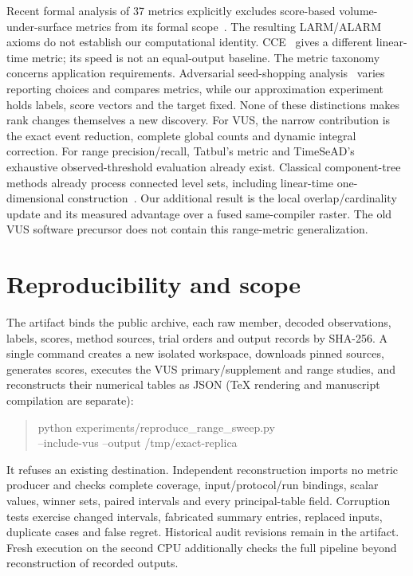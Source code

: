 Recent formal analysis of 37 metrics explicitly excludes score-based
volume-under-surface metrics from its formal scope~\cite{wagner2025formallyexploringtimeseriesanomaly}.
The resulting LARM/ALARM axioms do not establish our computational identity.
CCE~\cite{zhong2025cceconfidenceconsistencyevaluationtime} gives a different
linear-time metric; its speed is not an equal-output baseline. The metric
taxonomy~\cite{yang2026problemorientedtaxonomyevaluationmetrics} concerns
application requirements. Adversarial seed-shopping
analysis~\cite{lyu2026didactuallyfixit} varies reporting choices and compares
metrics, while our approximation experiment holds labels, score vectors and
the target fixed. None of these distinctions makes rank changes themselves a
new discovery. For VUS, the narrow contribution is the exact event reduction, complete global
counts and dynamic integral correction. For range precision/recall, Tatbul's
metric and TimeSeAD's exhaustive observed-threshold evaluation already exist.
Classical component-tree methods already process connected level sets, including
linear-time one-dimensional construction~\cite{menotti2007}.
Our additional result is the local overlap/cardinality update and its measured
advantage over a fused same-compiler raster. The old VUS software precursor does
not contain this range-metric generalization.

\section{Reproducibility and scope}
The artifact binds the public archive, each raw member, decoded observations,
labels, scores, method sources, trial orders and output records by SHA-256.
A single command creates a new isolated workspace, downloads pinned sources,
generates scores, executes the VUS primary/supplement and range studies, and reconstructs their numerical tables
as JSON (TeX rendering and manuscript compilation are separate):
\begin{quote}\small\ttfamily
python experiments/reproduce\_range\_sweep.py\\
\hspace*{1em}--include-vus --output /tmp/exact-replica
\end{quote}
It refuses an existing destination. Independent reconstruction imports no
metric producer and checks complete coverage, input/protocol/run bindings,
scalar values, winner sets, paired intervals and every principal-table field.
Corruption tests exercise changed intervals, fabricated summary entries,
replaced inputs, duplicate cases and false regret. Historical audit revisions
remain in the artifact. Fresh execution on the second CPU additionally checks
the full pipeline beyond reconstruction of recorded outputs.

